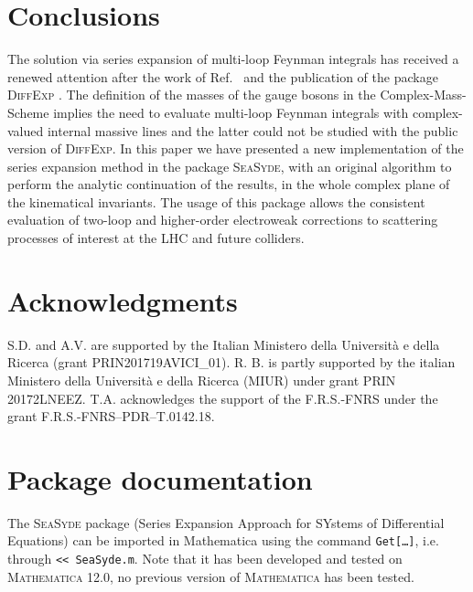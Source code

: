 \documentclass[final,1p,times]{elsarticle}
\begin{document}
\section{Conclusions}
\label{sec:conclusion}
The solution via series expansion of multi-loop Feynman integrals has received a renewed attention after the work of Ref.~\cite{Moriello:2019yhu} and the publication of the package \textsc{DiffExp} \cite{Hidding:2020ytt}.
The definition of the masses of the gauge bosons in the Complex-Mass-Scheme implies the need to evaluate multi-loop Feynman integrals with complex-valued internal massive lines and the latter could not be studied with the public version of \textsc{DiffExp}.
In this paper we have presented a new implementation of the series expansion method in the package \textsc{SeaSyde}, with an original algorithm to perform the analytic continuation of the results, in the whole complex plane of the kinematical invariants.
The usage of this package allows the consistent evaluation of two-loop and higher-order electroweak corrections to scattering processes of interest at the LHC and future colliders.




\section*{Acknowledgments}
S.D. and A.V. are supported by the Italian Ministero della Universit\`a e della Ricerca (grant PRIN201719AVICI\_01).
R. B. is partly supported by the italian Ministero della Universit\`a e della Ricerca (MIUR) under grant PRIN 20172LNEEZ.
T.A. acknowledges the support of the F.R.S.-FNRS under the grant F.R.S.-FNRS–PDR–T.0142.18.


\appendix


\section{Package documentation}
\label{app:packagedoc}


The \textsc{SeaSyde} package (Series Expansion Approach for SYstems of Differential Equations) can be imported in Mathematica using the command \texttt{Get[\dots]}, i.e. through \texttt{<< SeaSyde.m}. Note that it has been developed and tested on \textsc{Mathematica 12.0}, no previous version of \textsc{Mathematica} has been tested. 
\end{document}
